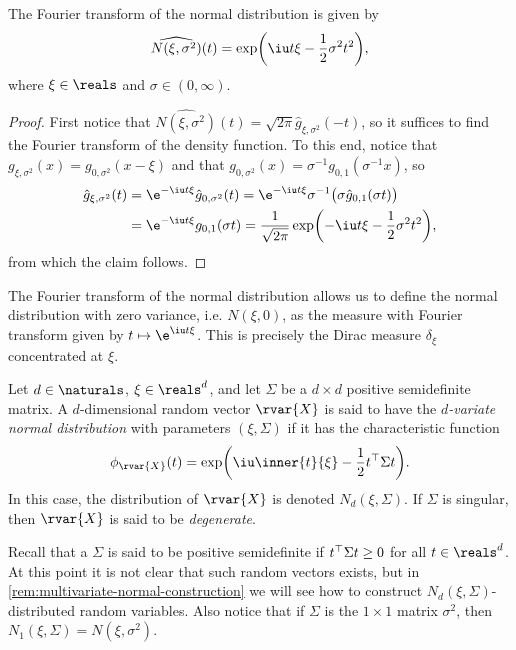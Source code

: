 \documentclass[article, a4paper, 11pt, oneside]{memoir}
\numberwithin{equation}{chapter}
\begin{document}
\begin{proposition}
    The Fourier transform of the normal distribution is given by
    \begin{equation*}
        \widehat{N(\xi,\sigma^2)}(t)
            = \exp\biggl( \iu t \xi - \frac{1}{2} \sigma^2 t^2 \biggr),
    \end{equation*}
    where $\xi \in \reals$ and $\sigma \in (0,\infty)$.
\end{proposition}

\begin{proof}
    First notice that $\widehat{N(\xi,\sigma^2)}(t) = \sqrt{2\pi} \hat{g}_{\xi,\sigma^2}(-t)$, so it suffices to find the Fourier transform of the density function. To this end, notice that $g_{\xi,\sigma^2}(x) = g_{0,\sigma^2}(x-\xi)$ and that $g_{0,\sigma^2}(x) = \sigma^{-1}g_{0,1}(\sigma^{-1}x)$, so
    \begin{align*}
        \hat{g}_{\xi,\sigma^2}(t)
            &= \e^{-\iu t \xi} \hat{g}_{0,\sigma^2}(t)
             = \e^{-\iu t \xi} \sigma^{-1} \bigl( \sigma \hat{g}_{0,1}(\sigma t) \bigr) \\
            &= \e^{-\iu t \xi} g_{0,1}(\sigma t)
             = \frac{1}{\sqrt{2\pi}} \exp \biggl( -\iu t \xi - \frac{1}{2} \sigma^2 t^2 \biggr),
    \end{align*}
    from which the claim follows.
\end{proof}


\begin{remark}
    The Fourier transform of the normal distribution allows us to define the normal distribution with zero variance, i.e. $N(\xi,0)$, as the measure with Fourier transform given by $t \mapsto \e^{\iu t \xi}$. This is precisely the Dirac measure $\delta_\xi$ concentrated at $\xi$.
\end{remark}

\begin{definition}
    Let $d \in \naturals$, $\xi \in \reals^d$, and let $\Sigma$ be a $d \times d$ positive semidefinite matrix. A $d$-dimensional random vector $\rvar{X}$ is said to have the \emph{$d$-variate normal distribution} with parameters $(\xi,\Sigma)$ if it has the characteristic function
    \begin{equation*}
        \phi_{\rvar{X}}(t)
            = \exp\biggl( \iu \inner{t}{\xi} - \frac{1}{2} t\trans \Sigma t \biggr).
    \end{equation*}
    In this case, the distribution of $\rvar{X}$ is denoted $N_d(\xi,\Sigma)$. If $\Sigma$ is singular, then $\rvar{X}$ is said to be \emph{degenerate}.
\end{definition}
%
Recall that a $\Sigma$ is said to be positive semidefinite if $t^{\top} \Sigma t \geq 0$ for all $t \in \reals^d$. At this point it is not clear that such random vectors exists, but in \cref{rem:multivariate-normal-construction} we will see how to construct $N_d(\xi,\Sigma)$-distributed random variables. Also notice that if $\Sigma$ is the $1 \times 1$ matrix $\sigma^2$, then $N_1(\xi,\Sigma) = N(\xi,\sigma^2)$.
\end{document}
